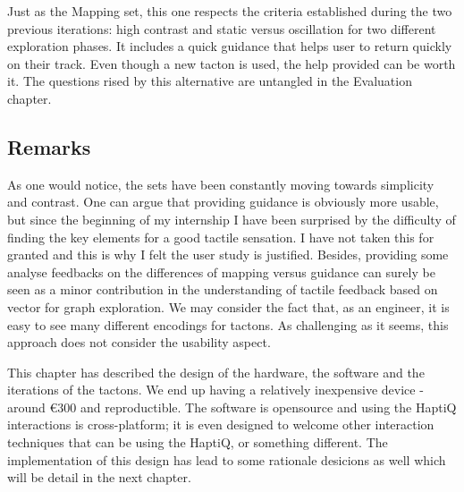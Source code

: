 Just as the Mapping set, this one respects the criteria established
during the two previous iterations: high contrast and static versus
oscillation for two different exploration phases. It includes a quick
guidance that helps user to return quickly on their track. Even though a
new tacton is used, the help provided can be worth it. The questions
rised by this alternative are untangled in the Evaluation chapter.

\subsection{Remarks}\label{remarks}

As one would notice, the sets have
been constantly moving towards simplicity and contrast. One can argue
that providing guidance is obviously more usable, but since the
beginning of my internship I have been surprised by the difficulty of
finding the key elements for a good tactile sensation. I have not taken
this for granted and this is why I felt the user study is justified.
Besides, providing some analyse feedbacks on the differences of mapping
versus guidance can surely be seen as a minor contribution in the
understanding of tactile feedback based on vector for graph exploration.
We may consider the fact that, as an engineer, it is easy to see many
different encodings for tactons. As challenging as it seems, this approach does not
consider the usability aspect.

This chapter has described the design of the hardware, the software and the iterations of the tactons. We end up having a relatively inexpensive device -
around \euro{300} and reproductible. The software is opensource and
using the HaptiQ interactions is cross-platform; it is even designed to
welcome other interaction techniques that can be using the HaptiQ, or something different.
The implementation of this design has lead to some rationale desicions
as well which will be detail in the next chapter.
